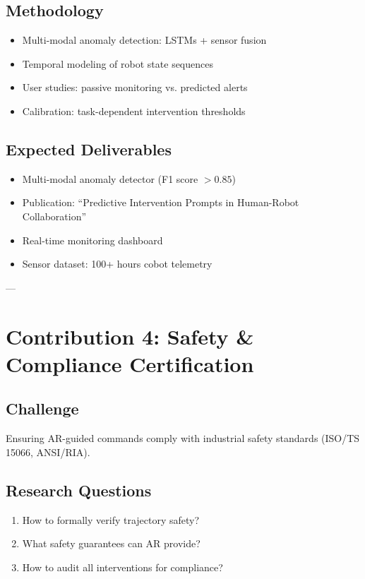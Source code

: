 \documentclass[12pt,a4paper,oneside]{book}
\begin{document}
\subsection{Methodology}
\begin{itemize}
    \item Multi-modal anomaly detection: LSTMs + sensor fusion
    \item Temporal modeling of robot state sequences
    \item User studies: passive monitoring vs. predicted alerts
    \item Calibration: task-dependent intervention thresholds
\end{itemize}

\subsection{Expected Deliverables}
\begin{tcolorbox}[colback=lightgreen, colframe=darkgreen]
\begin{itemize}
    \item Multi-modal anomaly detector (F1 score $> 0.85$)
    \item Publication: ``Predictive Intervention Prompts in Human-Robot Collaboration''
    \item Real-time monitoring dashboard
    \item Sensor dataset: 100+ hours cobot telemetry
\end{itemize}
\end{tcolorbox}

---

\section{Contribution 4: Safety \& Compliance Certification}

\subsection{Challenge}
Ensuring AR-guided commands comply with industrial safety standards (ISO/TS 15066, ANSI/RIA).

\subsection{Research Questions}
\begin{enumerate}
    \item How to formally verify trajectory safety?
    \item What safety guarantees can AR provide?
    \item How to audit all interventions for compliance?
\end{enumerate}
\end{document}
